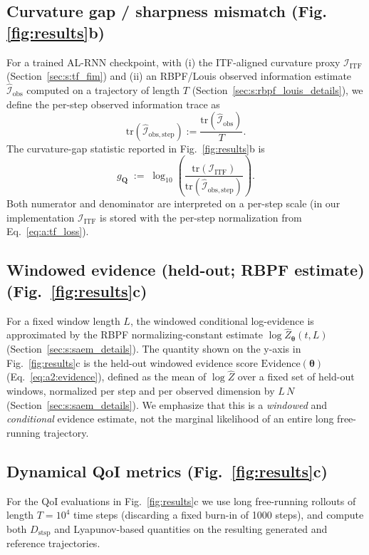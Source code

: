 \documentclass[twoside]{article}
\theoremstyle{plain}
\theoremstyle{definition}
\theoremstyle{remark}
\newcommand{\tr}{\mathrm{tr}}
\newcommand{\Iohat}{\bm{\widehat{\mathcal{I}}}_{\mathrm{obs}}}
\newcommand{\Iostephat}{\bm{\widehat{\mathcal{I}}}_{\mathrm{obs,step}}}
\begin{document}
\subsection{Curvature gap / sharpness mismatch (Fig.\ref{fig:results}b)}
For a trained AL-RNN checkpoint, with (i) the ITF-aligned curvature proxy $\bm{\mathcal{I}}_{\mathrm{ITF}}$ (Section~\ref{sec:s:tf_fim}) and (ii) an RBPF/Louis observed information estimate $\Iohat$ computed on a trajectory of length $T$ (Section~\ref{sec:s:rbpf_louis_details}), we define the per-step observed information trace as
\begin{equation}
\tr(\Iostephat):=\frac{\tr(\Iohat)}{T}.
\end{equation}
The curvature-gap statistic reported in Fig.~\ref{fig:results}b is
\begin{equation}
\label{eq:s:gQ_def}
g_{\bm Q} \;:=\; \log_{10}\left(\frac{\tr(\bm{\mathcal{I}}_{\mathrm{ITF}})}{\tr(\Iostephat)}\right).
\end{equation}
Both numerator and denominator are interpreted on a per-step scale (in our implementation $\bm{\mathcal{I}}_{\mathrm{ITF}}$ is stored with the per-step normalization from Eq.~\eqref{eq:a:tf_loss}).

\subsection{Windowed evidence (held-out; RBPF estimate) (Fig.~\ref{fig:results}c)}
For a fixed window length $L$, the windowed conditional log-evidence is approximated by the RBPF normalizing-constant estimate $\log\widehat Z_{\bm\theta}(t,L)$ (Section~\ref{sec:s:saem_details}).
The quantity shown on the y-axis in Fig.~\ref{fig:results}c is the held-out windowed evidence score
$\mathrm{Evidence}(\bm\theta)$ (Eq.~\eqref{eq:a2:evidence}),
defined as the mean of $\log\widehat Z$ over a fixed set of held-out windows, normalized per step and per observed dimension by $L\,N$ (Section~\ref{sec:s:saem_details}).
We emphasize that this is a \emph{windowed} and \emph{conditional} evidence estimate, not the marginal likelihood of an entire long free-running trajectory.

\subsection{Dynamical QoI metrics (Fig.~\ref{fig:results}c)}
For the QoI evaluations in Fig.~\ref{fig:results}c we use long free-running rollouts of length $T=10^4$ time steps (discarding a fixed burn-in of 1000 steps), and compute both $D_{\mathrm{stsp}}$ and Lyapunov-based quantities on the resulting generated and reference trajectories.
\end{document}
